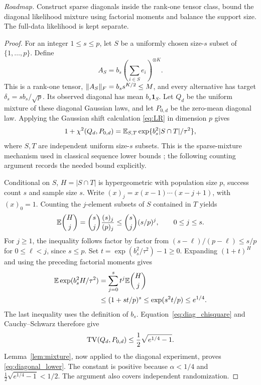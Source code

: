 \noindent\emph{Roadmap.} Construct sparse diagonals inside the rank-one tensor class, bound the diagonal likelihood mixture using factorial moments and balance the support size. The full-data likelihood is kept separate.
\begin{proof}
For an integer $1\le s\le p$, let $S$ be a uniformly chosen size-$s$ subset of $\{1,\ldots,p\}$. Define
\[
 A_S=b_s\left(\sum_{i\in S}e_i\right)^{\otimes K}.
\]
This is a rank-one tensor, $\lVert A_S\rVert_F=b_s s^{K/2}\le M$, and every alternative has target $\delta_s=s b_s/\sqrt p$. Its observed diagonal has mean $b_s\mathbf1_S$. Let $Q_d$ be the uniform mixture of these diagonal Gaussian laws, and let $P_{0,d}$ be the zero-mean diagonal law. Applying the Gaussian shift calculation \eqref{eq:LR} in dimension $p$ gives
\begin{equation}\label{eq:diag_chisquare}
 1+\chi^2(Q_d,P_{0,d})
 =\mathbb E_{S,T}\exp\{b_s^2|S\cap T|/\tau^2\},
\end{equation}
where $S,T$ are independent uniform size-$s$ subsets. This is the sparse-mixture mechanism used in classical sequence lower bounds \citep{collier2017}; the following counting argument records the needed bound explicitly.

Conditional on $S$, $H=|S\cap T|$ is hypergeometric with population size $p$, success count $s$ and sample size $s$. Write $(x)_j=x(x-1)\cdots(x-j+1)$, with $(x)_0=1$. Counting the $j$-element subsets of $S$ contained in $T$ yields
\[
 \mathbb E\binom Hj=\binom sj\frac{(s)_j}{(p)_j}
 \le\binom sj(s/p)^j,\qquad 0\le j\le s.
\]
For $j\ge1$, the inequality follows factor by factor from
$(s-\ell)/(p-\ell)\le s/p$ for $0\le\ell<j$, since $s\le p$.
Set $t=\exp(b_s^2/\tau^2)-1\ge0$. Expanding $(1+t)^H$ and using the preceding factorial moments gives
\begin{align*}
 \mathbb E\exp(b_s^2H/\tau^2)
 &=\sum_{j=0}^s t^j\mathbb E\binom Hj\\
 &\le (1+st/p)^s
 \le \exp(s^2t/p)
 \le e^{1/4}.
\end{align*}
The last inequality uses the definition of $b_s$. Equation~\eqref{eq:diag_chisquare} and Cauchy--Schwarz therefore give
\[
 \operatorname{TV}(Q_d,P_{0,d})\le\frac12\sqrt{e^{1/4}-1}.
\]
Lemma~\ref{lem:mixture}, now applied to the diagonal experiment, proves \eqref{eq:diagonal_lower}. The constant is positive because $\alpha<1/4$ and $\frac12\sqrt{e^{1/4}-1}<1/2$. The argument also covers independent randomization.


\end{proof}

